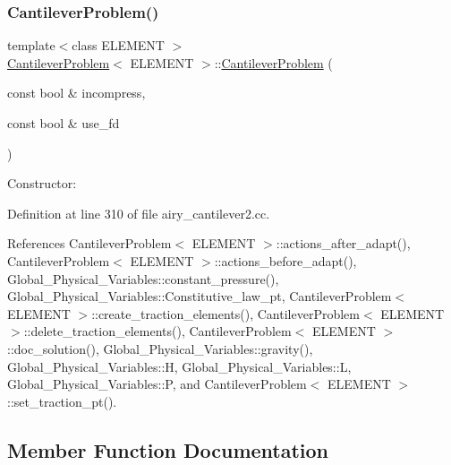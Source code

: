 \mbox{\label{classCantileverProblem_a83b396aa3bd0c2d9a491c605c208de83}} 
\subsubsection{\texorpdfstring{Cantilever\+Problem()}{CantileverProblem()}\hspace{0.1cm}{\footnotesize\ttfamily [2/2]}}
{\footnotesize\ttfamily template$<$class E\+L\+E\+M\+E\+NT $>$ \\
\hyperlink{classCantileverProblem}{Cantilever\+Problem}$<$ E\+L\+E\+M\+E\+NT $>$\+::\hyperlink{classCantileverProblem}{Cantilever\+Problem} (\begin{DoxyParamCaption}\item[{const bool \&}]{incompress,  }\item[{const bool \&}]{use\+\_\+fd }\end{DoxyParamCaption})}



Constructor\+: 



Definition at line 310 of file airy\+\_\+cantilever2.\+cc.



References Cantilever\+Problem$<$ E\+L\+E\+M\+E\+N\+T $>$\+::actions\+\_\+after\+\_\+adapt(), Cantilever\+Problem$<$ E\+L\+E\+M\+E\+N\+T $>$\+::actions\+\_\+before\+\_\+adapt(), Global\+\_\+\+Physical\+\_\+\+Variables\+::constant\+\_\+pressure(), Global\+\_\+\+Physical\+\_\+\+Variables\+::\+Constitutive\+\_\+law\+\_\+pt, Cantilever\+Problem$<$ E\+L\+E\+M\+E\+N\+T $>$\+::create\+\_\+traction\+\_\+elements(), Cantilever\+Problem$<$ E\+L\+E\+M\+E\+N\+T $>$\+::delete\+\_\+traction\+\_\+elements(), Cantilever\+Problem$<$ E\+L\+E\+M\+E\+N\+T $>$\+::doc\+\_\+solution(), Global\+\_\+\+Physical\+\_\+\+Variables\+::gravity(), Global\+\_\+\+Physical\+\_\+\+Variables\+::H, Global\+\_\+\+Physical\+\_\+\+Variables\+::L, Global\+\_\+\+Physical\+\_\+\+Variables\+::P, and Cantilever\+Problem$<$ E\+L\+E\+M\+E\+N\+T $>$\+::set\+\_\+traction\+\_\+pt().



\subsection{Member Function Documentation}
\mbox{\label{classCantileverProblem_af4d135ace3eac657b38de362e1644c75}} 
